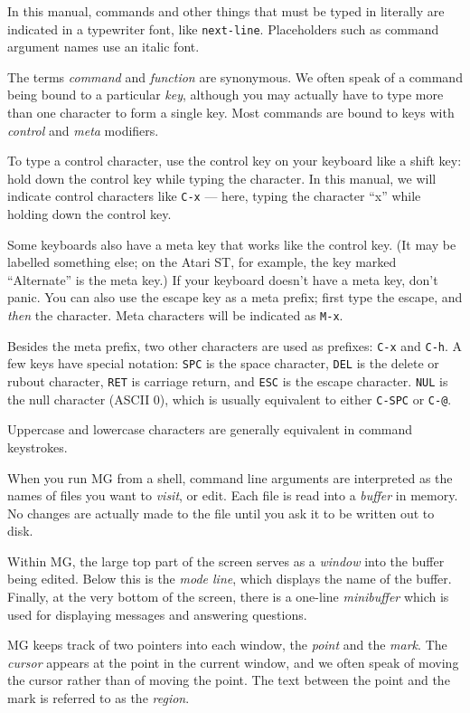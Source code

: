 In this manual, commands and other things that must be typed in 
literally are indicated in a typewriter font, like {\tt next-line}.
Placeholders such as command argument names use an italic font.

The terms {\em command\/} and {\em function\/} are synonymous.  We often
speak of a command being bound to a particular {\em key\/}, although you 
may actually have to type more than one character to form a single key.
Most commands are bound to keys with {\em control\/} and {\em meta\/} 
modifiers.

To type a control character, use the control key on your
keyboard like a shift key:  hold down the control key while typing the
character.  In this manual, we will indicate control characters like
\verb"C-x" --- here, typing the character ``x'' while holding down
the control key.

Some keyboards also have a meta key that works like the control
key.  (It may be labelled something else;  on the Atari ST, for example,
the key marked  ``Alternate'' is the meta key.)  If your keyboard doesn't
have a meta key, don't panic.  You can also use the escape key as a meta
prefix; first type the escape, and {\em then\/} the character.  Meta
characters will be indicated as \verb"M-x".

Besides the meta prefix, two other characters are used as prefixes:
\verb"C-x" and \verb"C-h".  A few keys have special notation:  {\tt SPC} is
the space character, {\tt DEL} is the delete or rubout character, {\tt RET}
is carriage return, and {\tt ESC} is the escape character.  {\tt NUL} is 
the null character (ASCII 0), which is usually equivalent to either 
\verb"C-SPC" or \verb"C-@".

Uppercase and lowercase characters are generally equivalent in command
keystrokes.

When you run MG from a shell, command line arguments are interpreted as the
names of files you want to {\em visit\/}, or edit.  Each file is 
read into a {\em buffer\/} in memory.  No changes are actually made to 
the file until you ask it to be written out to disk.

Within MG, the large top part of the screen serves as a {\em window\/} into
the buffer being edited.  Below this is the {\em mode line\/}, which 
displays the name of the buffer.  Finally, at the very bottom of the screen,
there is a one-line {\em minibuffer\/} which is used for displaying
messages and answering questions.

MG keeps track of two pointers into each window, the {\em point\/} and the
{\em mark\/}.  The {\em cursor\/} appears at the point in the current
window, and we often speak of moving the cursor rather than of moving the
point.  The text between the point and the mark is referred to as the {\em
region\/}.


